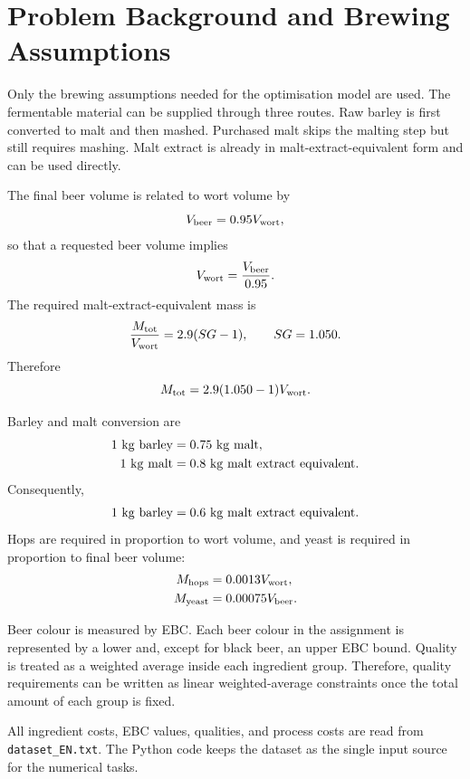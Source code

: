 \section{Problem Background and Brewing Assumptions}
\label{sec:background}
Only the brewing assumptions needed for the optimisation model are used. The fermentable material can be supplied through three routes. Raw barley is first converted to malt and then mashed. Purchased malt skips the malting step but still requires mashing. Malt extract is already in malt-extract-equivalent form and can be used directly.

The final beer volume is related to wort volume by
\begin{equation}
  V_{\mathrm{beer}} = 0.95 V_{\mathrm{wort}},
  \label{eq:beer-wort}
\end{equation}
so that a requested beer volume implies
\begin{equation}
  V_{\mathrm{wort}} = \frac{V_{\mathrm{beer}}}{0.95}.
  \label{eq:wort-from-beer}
\end{equation}
The required malt-extract-equivalent mass is
\begin{equation}
  \frac{M_{\mathrm{tot}}}{V_{\mathrm{wort}}} = 2.9(SG - 1), \qquad SG = 1.050.
  \label{eq:extract-ratio}
\end{equation}
Therefore
\begin{equation}
  M_{\mathrm{tot}} = 2.9(1.050 - 1)V_{\mathrm{wort}}.
  \label{eq:extract-total}
\end{equation}

Barley and malt conversion are
\begin{align}
  1~\kg\ \mathrm{barley} &= 0.75~\kg\ \mathrm{malt}, \label{eq:barley-to-malt}\\
  1~\kg\ \mathrm{malt} &= 0.8~\kg\ \mathrm{malt\ extract\ equivalent}. \label{eq:malt-to-extract}
\end{align}
Consequently,
\begin{equation}
  1~\kg\ \mathrm{barley} = 0.6~\kg\ \mathrm{malt\ extract\ equivalent}.
  \label{eq:barley-to-extract}
\end{equation}
Hops are required in proportion to wort volume, and yeast is required in proportion to final beer volume:
\begin{align}
  M_{\mathrm{hops}} &= 0.0013 V_{\mathrm{wort}}, \label{eq:hops}\\
  M_{\mathrm{yeast}} &= 0.00075 V_{\mathrm{beer}}. \label{eq:yeast}
\end{align}

Beer colour is measured by EBC. Each beer colour in the assignment is represented by a lower and, except for black beer, an upper EBC bound. Quality is treated as a weighted average inside each ingredient group. Therefore, quality requirements can be written as linear weighted-average constraints once the total amount of each group is fixed.

All ingredient costs, EBC values, qualities, and process costs are read from \texttt{dataset\_EN.txt}. The Python code keeps the dataset as the single input source for the numerical tasks.
